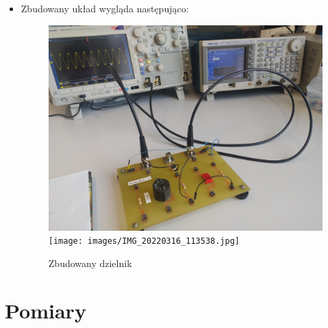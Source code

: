 \begin{itemize}
    \item Zbudowany układ wygląda następująco:
    \begin{figure}[h]
        \centering
        \includegraphics[scale = 0.05]{images/IMG_20220316_113526.jpg}
        \texttt{[image: images/IMG\_20220316\_113538.jpg]}
        \caption{Zbudowany dzielnik}
        \label{fig:my_label}
    \end{figure}
    
\end{itemize}

\section{Pomiary}
    
